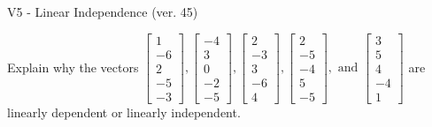 \begin{exercise}
  \begin{exerciseTitle}V5 - Linear Independence (ver. 45)\end{exerciseTitle}
  \begin{exerciseStatement}
    Explain why the vectors \(\left[\begin{array}{r}
1 \\
-6 \\
2 \\
-5 \\
-3
\end{array}\right] , \left[\begin{array}{r}
-4 \\
3 \\
0 \\
-2 \\
-5
\end{array}\right] , \left[\begin{array}{r}
2 \\
-3 \\
3 \\
-6 \\
4
\end{array}\right] , \left[\begin{array}{r}
2 \\
-5 \\
-4 \\
5 \\
-5
\end{array}\right] , \text{ and } \left[\begin{array}{r}
3 \\
5 \\
4 \\
-4 \\
1
\end{array}\right]\) are linearly dependent or linearly independent.	



\end{exerciseStatement}
\end{exercise}
